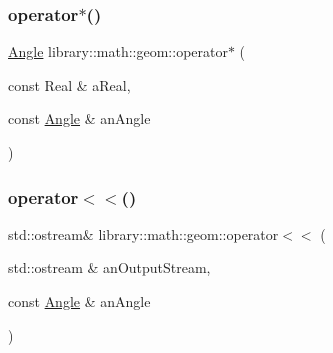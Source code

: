 \subsubsection{\texorpdfstring{operator$\ast$()}{operator*()}}
{\footnotesize\ttfamily \hyperlink{classlibrary_1_1math_1_1geom_1_1_angle}{Angle} library\+::math\+::geom\+::operator$\ast$ (\begin{DoxyParamCaption}\item[{const Real \&}]{a\+Real,  }\item[{const \hyperlink{classlibrary_1_1math_1_1geom_1_1_angle}{Angle} \&}]{an\+Angle }\end{DoxyParamCaption})}

\mbox{\label{namespacelibrary_1_1math_1_1geom_adeb31e2f219ef8195271d7655dedd3b8}} 
\subsubsection{\texorpdfstring{operator$<$$<$()}{operator<<()}}
{\footnotesize\ttfamily std\+::ostream\& library\+::math\+::geom\+::operator$<$$<$ (\begin{DoxyParamCaption}\item[{std\+::ostream \&}]{an\+Output\+Stream,  }\item[{const \hyperlink{classlibrary_1_1math_1_1geom_1_1_angle}{Angle} \&}]{an\+Angle }\end{DoxyParamCaption})}

